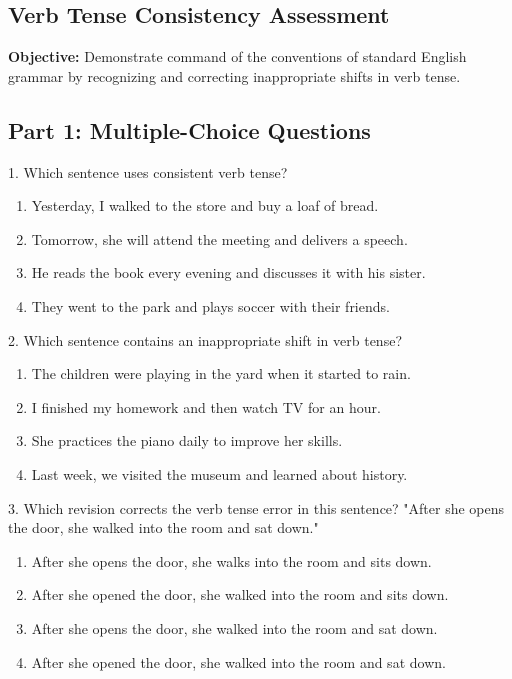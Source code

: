 \documentclass[12pt]{article}
\begin{document}
\subsection*{Verb Tense Consistency Assessment}
\onehalfspacing

\begin{tcolorbox}[colframe=black!40, colback=gray!0, title=Learning Objective]
\textbf{Objective:} Demonstrate command of the conventions of standard English grammar by recognizing and correcting inappropriate shifts in verb tense.
\end{tcolorbox}

\subsection*{Part 1: Multiple-Choice Questions}

1. Which sentence uses consistent verb tense?  
\begin{enumerate}[label=\Alph*.]
    \item Yesterday, I walked to the store and buy a loaf of bread.  
    \item Tomorrow, she will attend the meeting and delivers a speech.  
    \item He reads the book every evening and discusses it with his sister.  
    \item They went to the park and plays soccer with their friends.  
\end{enumerate}

\vspace{1cm}

2. Which sentence contains an inappropriate shift in verb tense?  
\begin{enumerate}[label=\Alph*.]
    \item The children were playing in the yard when it started to rain.  
    \item I finished my homework and then watch TV for an hour.  
    \item She practices the piano daily to improve her skills.  
    \item Last week, we visited the museum and learned about history.  
\end{enumerate}

\vspace{1cm}

3. Which revision corrects the verb tense error in this sentence?  
"After she opens the door, she walked into the room and sat down."  
\begin{enumerate}[label=\Alph*.]
    \item After she opens the door, she walks into the room and sits down.  
    \item After she opened the door, she walked into the room and sits down.  
    \item After she opens the door, she walked into the room and sat down.  
    \item After she opened the door, she walked into the room and sat down.  
\end{enumerate}
\end{document}
